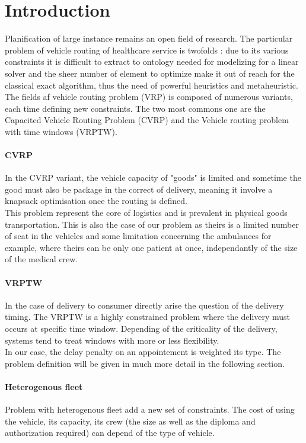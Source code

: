 \documentclass[12pt]{memoir}
\begin{document}
\section{Introduction}
Planification of large instance remains an open field of research. The particular
problem of vehicle routing of healthcare service is twofolds : due to its
various constraints it is difficult to extract to ontology needed for modelizing for
a linear solver and the sheer number of element to optimize make it out of reach for
the classical exact algorithm, thus the need of powerful heuristics and 
metaheuristic. The fields af vehicle routing problem (VRP) is composed of numerous variants, each time defining new constraints. The two most commons one are the Capacited Vehicle Routing Problem (CVRP) and the Vehicle routing problem with time windows (VRPTW).

\paragraph{CVRP} %
\label{par:CVRP}
In the CVRP variant, the vehicle capacity of "goods" is limited and sometime the
good must also be package in the correct of delivery, meaning it involve a knapsack
optimisation once the routing is defined.\\
This problem represent the core of logistics and is prevalent in physical goods transportation. This is also the case
of our problem as theirs is a limited number of seat in the vehicles and some
limitation concerning the ambulances for example, where theirs can be only one
patient at once, independantly of the size of the medical crew.

\paragraph{VRPTW} %
\label{par:VRPTW}
In the case of delivery to consumer directly arise the question of the delivery
timing. The VRPTW is a highly constrained problem where the delivery must occurs
at specific time window. Depending of the criticality of the delivery, systems tend
to treat windows with more or less flexibility. \\ 
In our case, the delay penalty on an appointement is weighted its type. The problem definition will be given in much more
detail in the following section.

\paragraph{Heterogenous fleet} %
\label{par:Heterogenous fleet}
Problem with heterogenous fleet add a new set of constraints. The cost of using
the vehicle, its capacity, its crew (the size as well as the diploma and
authorization required) can depend of the type of vehicle.
\end{document}
